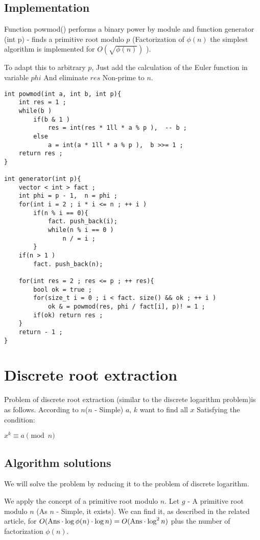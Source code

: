 \subsection{ Implementation }

Function powmod() performs a binary power by module and function generator (int p) - finds a primitive root modulo $p$ (Factorization of $\phi (n)$ the simplest algorithm is implemented for $O (\sqrt {\phi (n)})$ ).

To adapt this to arbitrary $p$, Just add the calculation of the Euler function in variable $phi$ And eliminate $res$ Non-prime to $n$.

\begin{verbatim}
int powmod(int a, int b, int p){
    int res = 1 ;
    while(b )
        if(b & 1 )
            res = int(res * 1ll * a % p ),  -- b ;
        else
            a = int(a * 1ll * a % p ),  b >>= 1 ;
    return res ;
}
 
int generator(int p){
    vector < int > fact ;
    int phi = p - 1,  n = phi ;
    for(int i = 2 ; i * i <= n ; ++ i )
        if(n % i == 0){
            fact. push_back(i);
            while(n % i == 0 )
                n / = i ;
        }
    if(n > 1 )
        fact. push_back(n);
 
    for(int res = 2 ; res <= p ; ++ res){
        bool ok = true ;
        for(size_t i = 0 ; i < fact. size() && ok ; ++ i )
            ok & = powmod(res, phi / fact[i], p)! = 1 ;
        if(ok) return res ;
    }
    return - 1 ;
} 
\end{verbatim}
\section{ Discrete root extraction }
Problem of discrete root extraction (similar to the discrete logarithm problem)is as follows. According to $n$($n$ - Simple) $a$, $k$ want to find all $x$ Satisfying the condition:

$x ^ k \equiv a \pmod {n}$

\subsection{ Algorithm solutions }

We will solve the problem by reducing it to the problem of discrete logarithm.

We apply the concept of a primitive root modulo $n$. Let $g$ - A primitive root modulo $n$ (As $n$ - Simple, it exists). We can find it, as described in the related article, for $O ({\rm Ans} \cdot \log \phi (n) \cdot \log n) = O ({\rm Ans} \cdot \log ^ 2 n)$ plus the number of factorization $\phi (n)$.

